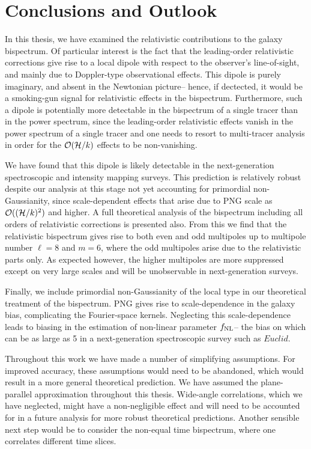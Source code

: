 \chapter{Conclusions and Outlook}
\label{chapter:summary}

In this thesis, we have examined the relativistic contributions to the galaxy bispectrum. Of particular interest is the fact that the leading-order relativistic corrections give rise to a local dipole with respect to the observer's line-of-sight, and mainly due to Doppler-type observational effects. This dipole is purely imaginary, and absent in the Newtonian picture-- hence, if dectected, it would be a smoking-gun signal for relativistic effects in the bispectrum. Furthermore, such a dipole is potentially more detectable in the bispectrum of a single tracer than in the power spectrum, since the leading-order relativistic effects vanish in the power spectrum of a single tracer and one needs to resort to multi-tracer analysis in order for the $\mathcal{O}(\mathcal{H}/k)$ effects to be non-vanishing. 

We have found that this dipole is likely detectable in the next-generation spectroscopic and intensity mapping surveys. This prediction is relatively robust despite our analysis at this stage not yet accounting for primordial non-Gaussianity, since scale-dependent effects that arise due to PNG scale as $\mathcal{O}((\mathcal{H}/k)^2)$ and higher. A full theoretical analysis of the bispectrum including all orders of relativistic corrections is presented also. From this we find that the relativistic bispectrum gives rise to both even and odd multipoles up to multipole number $\ell = 8$ and $m = 6$, where the odd multipoles arise due to the relativistic parts only. As expected however, the higher multipoles are more suppressed except on very large scales and will be unobservable in next-generation surveys. 

Finally, we include primordial non-Gaussianity of the local type in our theoretical treatment of the bispectrum. PNG gives rise to scale-dependence in the galaxy bias, complicating the Fourier-space kernels. Neglecting this scale-dependence leads to biasing in the estimation of non-linear parameter $f_\text{NL}$-- the bias on which can be as large as 5 in a next-generation spectroscopic survey such as $\textit{Euclid}$.

Throughout this work we have made a number of simplifying assumptions. For improved accuracy, these assumptions would need to be abandoned, which would result in a more general theoretical prediction. We have assumed the plane-parallel approximation throughout this thesis. Wide-angle correlations, which we have neglected, might have a non-negligible effect and will need to be accounted for in a future analysis for more robust theoretical predictions. Another sensible next step would be to consider the non-equal time bispectrum, where one correlates different time slices. 